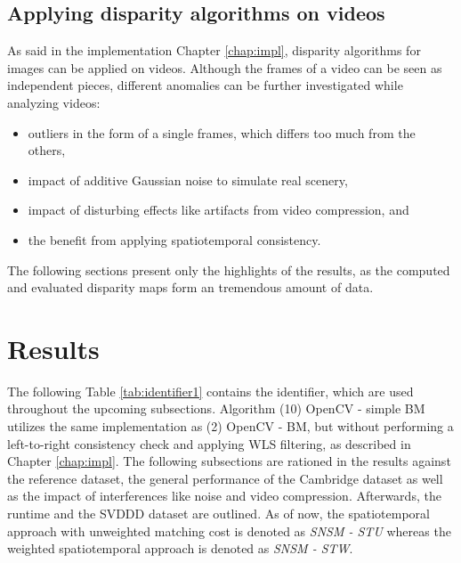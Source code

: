 \subsection*{Applying disparity algorithms on videos}

As said in the implementation Chapter \ref{chap:impl}, disparity algorithms for images can be applied on videos.
Although the frames of a video can be seen as independent pieces, different anomalies can be further investigated while analyzing videos:

\begin{itemize}
  \item outliers in the form of a single frames, which differs too much from the others,
  \item impact of additive Gaussian noise to simulate real scenery,
  \item impact of disturbing effects like artifacts from video compression, and
  \item the benefit from applying spatiotemporal consistency.
\end{itemize}

\noindent The following sections present only the highlights of the results, as the computed and evaluated disparity maps form an tremendous amount of data.

\section{Results}

The following Table \ref{tab:identifier1} contains the identifier, which are used throughout the upcoming subsections.
Algorithm (10) OpenCV - simple BM utilizes the same implementation as (2) OpenCV - BM, but without performing a left-to-right consistency check and applying WLS filtering, as described in Chapter \ref{chap:impl}.
The following subsections are rationed in the results against the reference dataset, the general performance of the Cambridge dataset as well as the impact of interferences like noise and video compression.
Afterwards, the runtime and the SVDDD dataset are outlined.
As of now, the spatiotemporal approach with unweighted matching cost is denoted as \textit{SNSM - STU} whereas the weighted spatiotemporal approach is denoted as \textit{SNSM - STW}.

